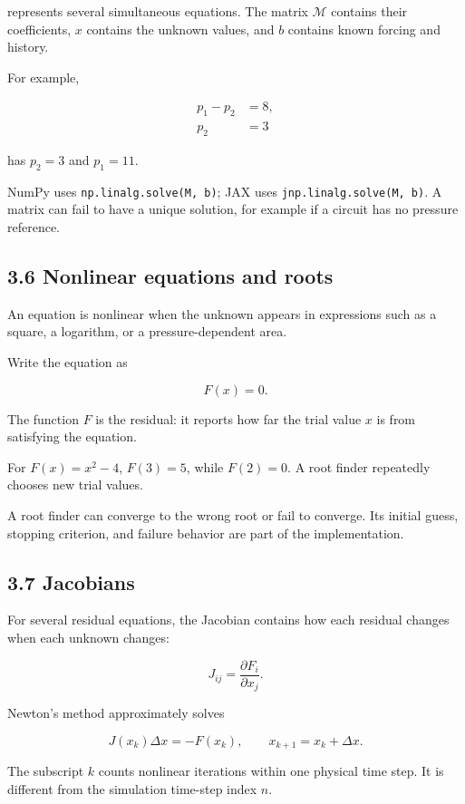 \documentclass[11pt,a4paper]{article}
\begin{document}
represents several simultaneous equations. The matrix \(\mathcal M\) contains their coefficients, \(x\) contains the unknown values, and \(b\) contains known forcing and history.

For example,


\begingroup\small
\[
\begin{aligned}
p_1-p_2&=8,\\
p_2&=3
\end{aligned}
\]
\endgroup


has \(p_2=3\) and \(p_1=11\).

NumPy uses \texttt{np.\allowbreak{}linalg.\allowbreak{}solve(M, b)}; JAX uses \texttt{jnp.\allowbreak{}linalg.\allowbreak{}solve(M, b)}. A matrix can fail to have a unique solution, for example if a circuit has no pressure reference.

\subsection{3.6 Nonlinear equations and roots}
An equation is nonlinear when the unknown appears in expressions such as a square, a logarithm, or a pressure-dependent area.

Write the equation as


\begingroup\small
\[
F(x)=0.
\]
\endgroup


The function \(F\) is the residual: it reports how far the trial value \(x\) is from satisfying the equation.

For \(F(x)=x^2-4\), \(F(3)=5\), while \(F(2)=0\). A root finder repeatedly chooses new trial values.

A root finder can converge to the wrong root or fail to converge. Its initial guess, stopping criterion, and failure behavior are part of the implementation.

\subsection{3.7 Jacobians}
For several residual equations, the Jacobian contains how each residual changes when each unknown changes:


\begingroup\small
\[
J_{ij}=\frac{\partial F_i}{\partial x_j}.
\]
\endgroup


Newton's method approximately solves


\begingroup\small
\[
J(x_k)\Delta x=-F(x_k),\qquad
x_{k+1}=x_k+\Delta x.
\]
\endgroup


The subscript \(k\) counts nonlinear iterations within one physical time step. It is different from the simulation time-step index \(n\).
\end{document}
